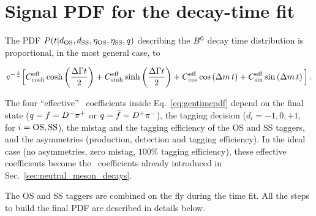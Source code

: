 \section{Signal PDF for the decay-time fit}
\label{app:timepdf}

The PDF $P(t | d_{\rm OS}, d_{\rm SS}, \eta_{\rm OS}, \eta_{\rm SS}, q)$ describing the $B^0$ decay time distribution is proportional, in the most general case, to

\begin{equation}
\label{eq:gentimepdf}
    e^{-\frac{t}{\tau}} \Big[ C^{\rm eff}_{\cosh}\cosh\left(\frac{\Delta\Gamma t}{2}\right) + C^{\rm eff}_{\sinh}\sinh\left(\frac{\Delta\Gamma t}{2}\right) 
    + C^{\rm eff}_{\cos}\cos\left(\Delta m\, t\right) + C^{\rm eff}_{\sin}\sin\left(\Delta m\, t\right) \Big]\,. 
\end{equation}

The four ``effective'' \CP~coefficients inside Eq.~\ref{eq:gentimepdf} depend on the final state ($q=f=D^-\pi^+$ or $q=\bar f=D^+\pi^-$), the tagging decision ($d_{i}=-1,0,+1$, for $i=\rm OS, \rm SS$), the mistag and the tagging efficiency of the OS and SS taggers, and the asymmetries (production, detection and tagging efficiency). In the ideal case (no asymmetries, zero mistag, $100\%$ tagging efficiency), these effective coefficients become the \CP~coefficients already introduced in Sec.~\ref{sec:neutral_meson_decays}.

The OS and SS taggers are combined on the fly during the time fit. All the steps to build the final PDF are described in details below.


